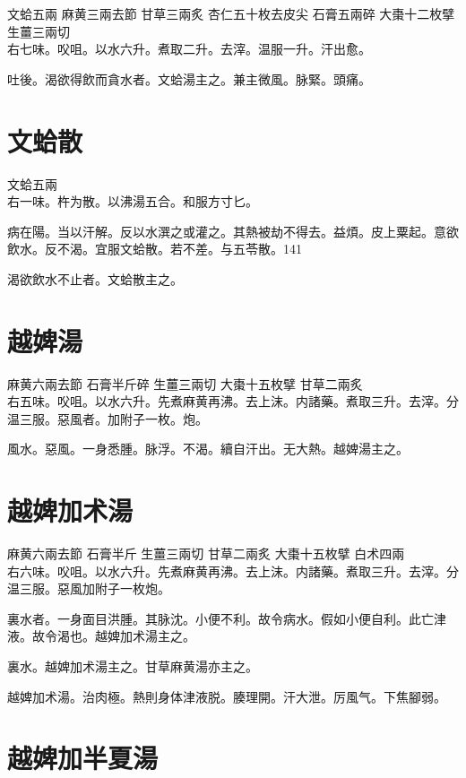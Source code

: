 文蛤{\scriptsize 五兩} 麻黄{\scriptsize 三兩去節} 甘草{\scriptsize 三兩炙} 杏仁{\scriptsize 五十枚去皮尖} 石膏{\scriptsize 五兩碎} 大棗{\scriptsize 十二枚擘} 生薑{\scriptsize 三兩切}\\
右七味。㕮咀。以水六升。煮取二升。去滓。温服一升。汗出愈。

吐後。渴欲得飲而貪水者。文蛤湯主之。兼主微風。脉緊。頭痛。

\section{文蛤散}

文蛤{\scriptsize 五兩}\\
右一味。杵为散。以沸湯五合。和服方寸匕。

病在陽。当以汗解。反以水潠之或灌之。其熱被劫不得去。益煩。皮上粟起。意欲飲水。反不渴。宜服文蛤散。若不差。与五苓散。141

渴欲飲水不止者。文蛤散主之。

\section{越婢湯}

麻黄{\scriptsize 六兩去節} 石膏{\scriptsize 半斤碎} 生薑{\scriptsize 三兩切} 大棗{\scriptsize 十五枚擘} 甘草{\scriptsize 二兩炙}\\
右五味。㕮咀。以水六升。先煮麻黄再沸。去上沫。内諸藥。煮取三升。去滓。分温三服。惡風者。加附子一枚。炮。

風水。惡風。一身悉腫。脉浮。不渴。續自汗出。无大熱。越婢湯主之。

\section{越婢加术湯}

麻黄{\scriptsize 六兩去節} 石膏{\scriptsize 半斤} 生薑{\scriptsize 三兩切} 甘草{\scriptsize 二兩炙} 大棗{\scriptsize 十五枚擘} 白术{\scriptsize 四兩}\\
右六味。㕮咀。以水六升。先煮麻黄再沸。去上沫。内諸藥。煮取三升。去滓。分温三服。惡風加附子一枚炮。

裏水者。一身面目洪腫。其脉沈。小便不利。故令病水。假如小便自利。此亡津液。故令渴也。越婢加术湯主之。

裏水。越婢加术湯主之。甘草麻黄湯亦主之。

越婢加术湯。治肉極。熱則身体津{\khaaitp 液}脱。腠理開。汗大泄。厉風气。下焦腳弱。

\section{越婢加半夏湯}

